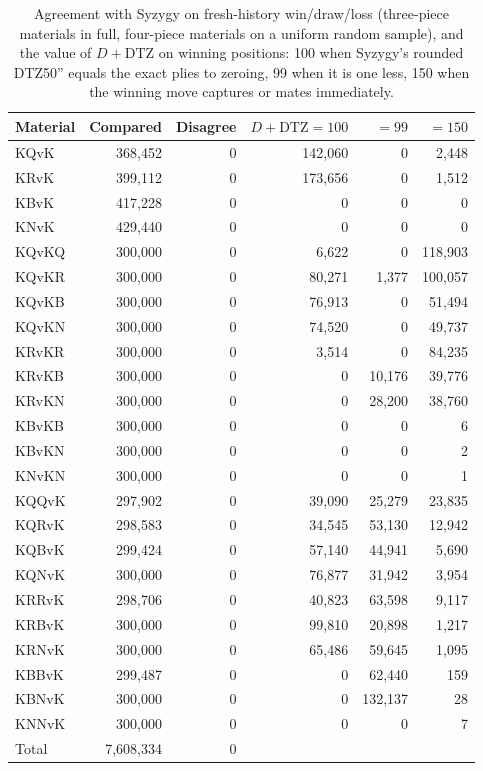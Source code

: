 \documentclass[journal]{IEEEtran}
\theoremstyle{definition}
\theoremstyle{remark}
\begin{document}
\begin{table}[t]\centering\small
\caption{Agreement with Syzygy on fresh-history win/draw/loss (three-piece materials in full, four-piece materials on a uniform random sample), and the value of $D+\mathrm{DTZ}$ on winning positions: 100 when Syzygy's rounded DTZ50'' equals the exact plies to zeroing, 99 when it is one less, 150 when the winning move captures or mates immediately.}
\label{tab:syzygy}
\begin{tabular}{@{}lrrrrr@{}}\toprule
Material & Compared & Disagree & $D{+}\mathrm{DTZ}{=}100$ & ${=}99$ & ${=}150$\\ \midrule
KQvK & 368{,}452 & 0 & 142{,}060 & 0 & 2{,}448\\
KRvK & 399{,}112 & 0 & 173{,}656 & 0 & 1{,}512\\
KBvK & 417{,}228 & 0 & 0 & 0 & 0\\
KNvK & 429{,}440 & 0 & 0 & 0 & 0\\
KQvKQ & 300{,}000 & 0 & 6{,}622 & 0 & 118{,}903\\
KQvKR & 300{,}000 & 0 & 80{,}271 & 1{,}377 & 100{,}057\\
KQvKB & 300{,}000 & 0 & 76{,}913 & 0 & 51{,}494\\
KQvKN & 300{,}000 & 0 & 74{,}520 & 0 & 49{,}737\\
KRvKR & 300{,}000 & 0 & 3{,}514 & 0 & 84{,}235\\
KRvKB & 300{,}000 & 0 & 0 & 10{,}176 & 39{,}776\\
KRvKN & 300{,}000 & 0 & 0 & 28{,}200 & 38{,}760\\
KBvKB & 300{,}000 & 0 & 0 & 0 & 6\\
KBvKN & 300{,}000 & 0 & 0 & 0 & 2\\
KNvKN & 300{,}000 & 0 & 0 & 0 & 1\\
KQQvK & 297{,}902 & 0 & 39{,}090 & 25{,}279 & 23{,}835\\
KQRvK & 298{,}583 & 0 & 34{,}545 & 53{,}130 & 12{,}942\\
KQBvK & 299{,}424 & 0 & 57{,}140 & 44{,}941 & 5{,}690\\
KQNvK & 300{,}000 & 0 & 76{,}877 & 31{,}942 & 3{,}954\\
KRRvK & 298{,}706 & 0 & 40{,}823 & 63{,}598 & 9{,}117\\
KRBvK & 300{,}000 & 0 & 99{,}810 & 20{,}898 & 1{,}217\\
KRNvK & 300{,}000 & 0 & 65{,}486 & 59{,}645 & 1{,}095\\
KBBvK & 299{,}487 & 0 & 0 & 62{,}440 & 159\\
KBNvK & 300{,}000 & 0 & 0 & 132{,}137 & 28\\
KNNvK & 300{,}000 & 0 & 0 & 0 & 7\\
\midrule
Total & 7{,}608{,}334 & 0 & & & \\
\bottomrule
\end{tabular}
\end{table}
\end{document}
